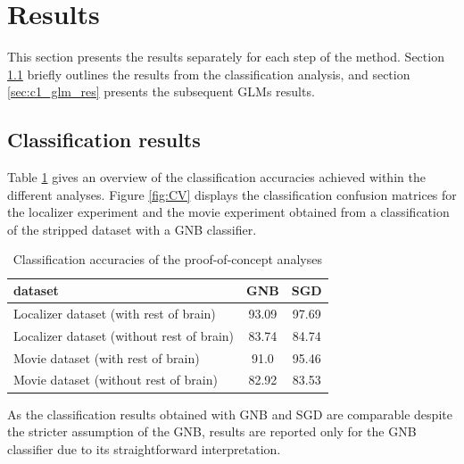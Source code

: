 \documentclass[a4paper, 12pt]{scrreprt}
\begin{document}
\section{Results}\label{section:c1_results}

This section presents the results separately for each step of the method. Section \ref{sec:c1_cv_res} briefly outlines the results from the classification analysis, and section \ref{sec:c1_glm_res} presents the subsequent GLMs results.

\subsection{Classification results}\label{sec:c1_cv_res}

Table \ref{tab:CV} gives an overview of the classification accuracies achieved within the different analyses. 
Figure \ref{fig:CV} displays the classification confusion matrices for the localizer experiment and the movie experiment obtained from a classification of the stripped dataset with a GNB classifier.

\begin{table}[h!]
	\begin{center}
		\caption{Classification accuracies of the proof-of-concept analyses}
		\label{tab:CV}
		\begin{tabular}{l|c|c} %
			\textbf{dataset} & \textbf{GNB} & \textbf{SGD}\\
			\hline
			Localizer dataset (with rest of brain) & 93.09 & 97.69\\
			Localizer dataset (without rest of brain) & 83.74 & 84.74\\
			Movie dataset (with rest of brain) & 91.0 & 95.46\\
			Movie dataset (without rest of brain) & 82.92 & 83.53 \\
		\end{tabular}
	\end{center}
\end{table}

As the classification results obtained with GNB and SGD are comparable despite the stricter assumption of the GNB, results are reported only for the GNB classifier due to its straightforward interpretation.
\end{document}
